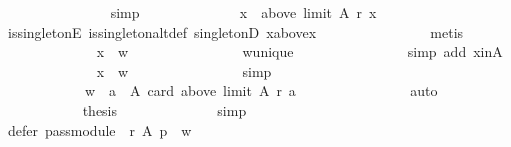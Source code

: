 \begin{isabellebody}
\ \ \ \ \ \ \ \ \ \ \ \ \ \ \isamarkupfalse%
\ simp\isanewline
\ \ \ \ \ \ \ \ \ \ \ \ \isamarkupfalse%
\ {\isachardoublequoteopen}{\isacharbraceleft}{\kern0pt}x{\isacharbraceright}{\kern0pt}\ {\isacharequal}{\kern0pt}\ above\ {\isacharparenleft}{\kern0pt}limit\ A\ r{\isacharparenright}{\kern0pt}\ x{\isachardoublequoteclose}\isanewline
\ \ \ \ \ \ \ \ \ \ \ \ \ \ \isamarkupfalse%
\ is{\isacharunderscore}{\kern0pt}singletonE\ is{\isacharunderscore}{\kern0pt}singleton{\isacharunderscore}{\kern0pt}altdef\ singletonD\ x{\isacharunderscore}{\kern0pt}above{\isacharunderscore}{\kern0pt}x\isanewline
\ \ \ \ \ \ \ \ \ \ \ \ \ \ \isamarkupfalse%
\ metis\isanewline
\ \ \ \ \ \ \ \ \ \ \ \ \isamarkupfalse%
\ {\isachardoublequoteopen}x\ {\isacharequal}{\kern0pt}\ w{\isachardoublequoteclose}\isanewline
\ \ \ \ \ \ \ \ \ \ \ \ \ \ \isamarkupfalse%
\ w{\isacharunderscore}{\kern0pt}unique\isanewline
\ \ \ \ \ \ \ \ \ \ \ \ \ \ \isamarkupfalse%
\ {\isacharparenleft}{\kern0pt}simp\ add{\isacharcolon}{\kern0pt}\ x{\isacharunderscore}{\kern0pt}in{\isacharunderscore}{\kern0pt}A{\isacharparenright}{\kern0pt}\isanewline
\ \ \ \ \ \ \ \ \ \ \ \ \isamarkupfalse%
\ {\isachardoublequoteopen}x\ {\isasymin}\ {\isacharbraceleft}{\kern0pt}w{\isacharbraceright}{\kern0pt}{\isachardoublequoteclose}\isanewline
\ \ \ \ \ \ \ \ \ \ \ \ \ \ \isamarkupfalse%
\ simp\isanewline
\ \ \ \ \ \ \ \ \ \ \isamarkupfalse%
\isanewline
\ \ \ \ \ \ \ \ \ \ \isamarkupfalse%
\ \isamarkupfalse%
\isanewline
\ \ \ \ \ \ \ \ \ \ \ \ {\isachardoublequoteopen}{\isacharbraceleft}{\kern0pt}w{\isacharbraceright}{\kern0pt}\ {\isacharequal}{\kern0pt}\ {\isacharbraceleft}{\kern0pt}a\ {\isasymin}\ A{\isachardot}{\kern0pt}\ card\ {\isacharparenleft}{\kern0pt}above\ {\isacharparenleft}{\kern0pt}limit\ A\ r{\isacharparenright}{\kern0pt}\ a{\isacharparenright}{\kern0pt}\ {\isasymle}\ {}{\isacharbraceright}{\kern0pt}{\isachardoublequoteclose}\isanewline
\ \ \ \ \ \ \ \ \ \ \ \ \isamarkupfalse%
\ auto\isanewline
\ \ \ \ \ \ \ \ \ \ \isamarkupfalse%
\ {\isacharquery}{\kern0pt}thesis\isanewline
\ \ \ \ \ \ \ \ \ \ \ \ \isamarkupfalse%
\ simp\isanewline
\ \ \ \ \ \ \ \ \isamarkupfalse%
\isanewline
\ \ \ \ \ \ \ \ \isamarkupfalse%
\ {\isachardoublequoteopen}defer\ {\isacharparenleft}{\kern0pt}pass{\isacharunderscore}{\kern0pt}module\ {}\ r{\isacharparenright}{\kern0pt}\ A\ p\ {\isacharequal}{\kern0pt}\ {\isacharbraceleft}{\kern0pt}w{\isacharbraceright}{\kern0pt}{\isachardoublequoteclose}\isanewline

\end{isabellebody}
